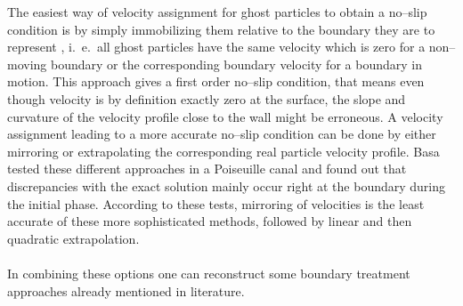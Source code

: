 \documentclass{report}
\begin{document}
The easiest way of velocity assignment for ghost particles to obtain a no--slip condition is by simply immobilizing them relative to the boundary they are to represent \cite{Morris1997}, i.\ e.\ all ghost particles have the same velocity which is zero for a non--moving boundary or the corresponding boundary velocity for a boundary in motion. This approach gives a first order 
no--slip condition, that means even though velocity is by definition exactly zero at the surface, the slope and curvature of the velocity profile close to the wall might be erroneous.  A velocity assignment leading to a more accurate no--slip condition can be done by either mirroring or extrapolating the corresponding real particle velocity profile. Basa \cite{Basa2009} tested these different approaches in a Poiseuille canal and found out that discrepancies with the exact solution mainly occur right at the boundary during the initial phase.  According to these tests, mirroring of velocities is the least accurate of these more sophisticated methods, followed by linear and then quadratic extrapolation. \\
\\
\indent
In combining these options one can reconstruct some boundary treatment approaches already mentioned in literature.
\end{document}
